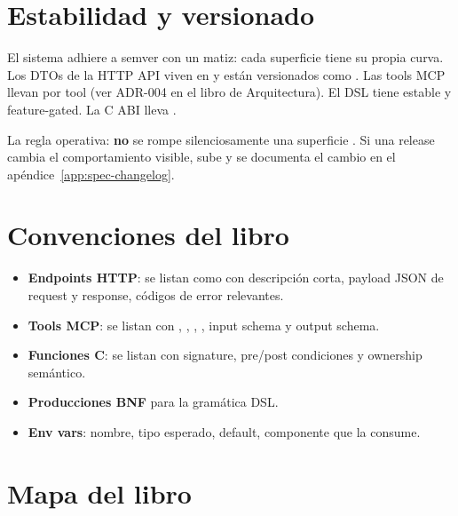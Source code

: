 \section{Estabilidad y versionado}

El sistema adhiere a semver con un matiz: cada superficie tiene su
propia curva. Los DTOs de la HTTP API viven en
 y están versionados como
. Las tools MCP llevan  por tool (ver ADR-004
en el libro de Arquitectura). El DSL tiene  estable y
 feature-gated. La C ABI lleva
.

La regla operativa: \textbf{no} se rompe silenciosamente una
superficie . Si una release cambia el comportamiento
visible, sube  y se documenta el cambio en el
apéndice~\ref{app:spec-changelog}.

\section{Convenciones del libro}

\begin{itemize}
    \item \textbf{Endpoints HTTP}: se listan como
     con descripción corta, payload JSON de
    request y response, códigos de error relevantes.
    \item \textbf{Tools MCP}: se listan con ,
    , , , input schema y
    output schema.
    \item \textbf{Funciones C}: se listan con signature, pre/post
    condiciones y ownership semántico.
    \item \textbf{Producciones BNF} para la gramática DSL.
    \item \textbf{Env vars}: nombre, tipo esperado, default,
    componente que la consume.
\end{itemize}

\section{Mapa del libro}

